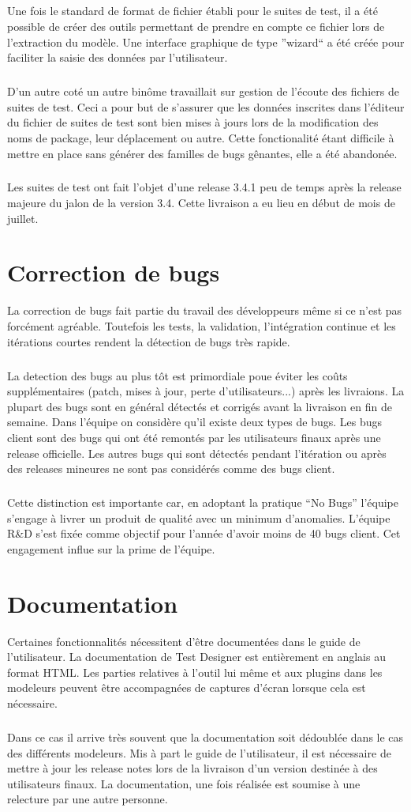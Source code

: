 \subparagraph*{}
Une fois le standard de format de fichier établi pour le suites de test, il a été possible de créer des outils permettant de prendre en compte ce fichier lors de l'extraction du modèle. Une interface graphique de type ''wizard`` a été créée pour faciliter la saisie des données par l'utilisateur.
\subparagraph*{}
D'un autre coté un autre binôme travaillait sur gestion de l'écoute des fichiers de suites de test. Ceci a pour but de s'assurer que les données inscrites dans l'éditeur du fichier de suites de test sont bien mises à jours lors de la modification des noms de package, leur déplacement ou autre. Cette fonctionalité étant difficile à mettre en place sans générer des familles de bugs gênantes, elle a été abandonée.
\subparagraph*{}
Les suites de test ont fait l'objet d'une release 3.4.1 peu de temps après la release majeure du jalon de la version 3.4. Cette livraison a eu lieu en début de mois de juillet.
\section{Correction de bugs}
La correction de bugs fait partie du travail des développeurs même si ce n'est pas forcément agréable. Toutefois les tests, la validation, l'intégration continue et les itérations courtes rendent la détection de bugs très rapide.
\subparagraph*{}
La detection des bugs au plus tôt est primordiale poue éviter les coûts supplémentaires (patch, mises à jour, perte d'utilisateurs...) après les livraions. La plupart des bugs sont en général détectés et corrigés avant la livraison en fin de semaine. Dans l'équipe on considère qu'il existe deux types de bugs. Les bugs client sont des bugs qui ont été remontés par les utilisateurs finaux après une release officielle. Les autres bugs qui sont détectés pendant l'itération ou après des releases mineures ne sont pas considérés comme des bugs client.
\subparagraph*{}
Cette distinction est importante car, en adoptant la pratique ``No Bugs'' l'équipe s'engage à livrer un produit de qualité avec un minimum d'anomalies. L'équipe R\&D s'est fixée comme objectif pour l'année d'avoir moins de 40 bugs client. Cet engagement influe sur la prime de l'équipe.
\section{Documentation}
Certaines fonctionnalités nécessitent d'être documentées dans le guide de l'utilisateur. La documentation de Test Designer est entièrement en anglais au format HTML. Les parties relatives à l'outil lui même et aux plugins dans les modeleurs peuvent être accompagnées de captures d'écran lorsque cela est nécessaire. 
\subparagraph*{}
Dans ce cas il arrive très souvent que la documentation soit dédoublée dans le cas des différents modeleurs. Mis à part le guide de l'utilisateur, il est nécessaire de mettre à jour les release notes lors de la livraison d'un version destinée à des utilisateurs finaux. La documentation, une fois réalisée est soumise à une relecture par une autre personne.
